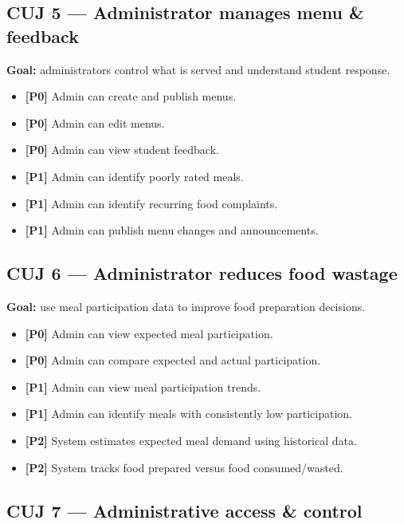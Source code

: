 \documentclass[12pt,a4paper]{article}
\newcommand{\priority}[1]{\textbf{[#1]}}
\begin{document}
\subsection{CUJ 5 --- Administrator manages menu \& feedback}

\textbf{Goal:} administrators control what is served and understand student
response.

\begin{itemize}
    \item \priority{P0} Admin can create and publish menus.
    \item \priority{P0} Admin can edit menus.
    \item \priority{P0} Admin can view student feedback.
    \item \priority{P1} Admin can identify poorly rated meals.
    \item \priority{P1} Admin can identify recurring food complaints.
    \item \priority{P1} Admin can publish menu changes and announcements.
\end{itemize}

\subsection{CUJ 6 --- Administrator reduces food wastage}

\textbf{Goal:} use meal participation data to improve food preparation decisions.

\begin{itemize}
    \item \priority{P0} Admin can view expected meal participation.
    \item \priority{P0} Admin can compare expected and actual participation.
    \item \priority{P1} Admin can view meal participation trends.
    \item \priority{P1} Admin can identify meals with consistently low participation.
    \item \priority{P2} System estimates expected meal demand using historical data.
    \item \priority{P2} System tracks food prepared versus food consumed/wasted.
\end{itemize}

\subsection{CUJ 7 --- Administrative access \& control}
\end{document}
